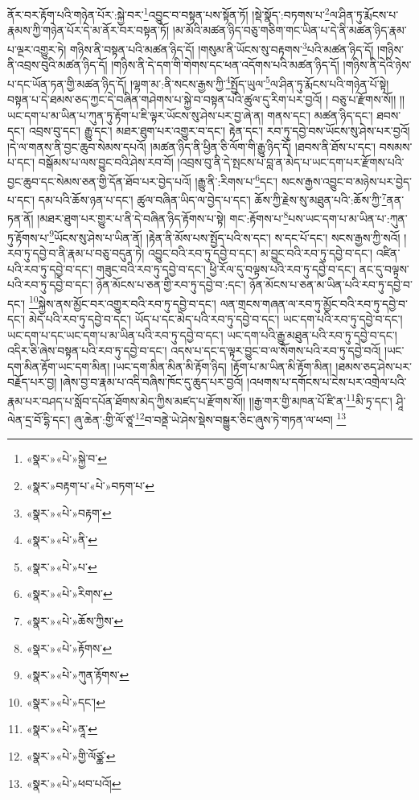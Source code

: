ནོར་བར་རྟོག་པའི་གཉེན་པོར་:སྐྱེ་བར་\footnote{«སྣར་»«པེ་»སྐྱེ་བ་}འབྱུང་བ་བསྟན་པས་སྟོན་ཏོ། །སྡེ་སྣོད་:བཏགས་པ་\footnote{«སྣར་»བརྟག་པ་«པེ་»བཏག་པ་}ལ་ཤིན་ཏུ་རྨོངས་པ་རྣམས་ཀྱི་གཉེན་པོར་དེ་མ་ནོར་བར་བསྟན་ཏོ། །མ་མོའི་མཚན་ཉིད་བཅུ་གཅིག་གང་ཡིན་པ་དེ་ནི་མཚན་ཉིད་རྣམ་པ་ལྔར་འགྱུར་ཏེ། གཉིས་ནི་བསྟན་པའི་མཚན་ཉིད་དོ། །གསུམ་ནི་ཡོངས་སུ་བརྟགས་\footnote{«སྣར་»«པེ་»བརྟག་}པའི་མཚན་ཉིད་དོ། །གཉིས་ནི་འབྲས་བུའི་མཚན་ཉིད་དོ། །གཉིས་ནི་དེ་དག་གི་གེགས་དང་ཕན་འདོགས་པའི་མཚན་ཉིད་དོ། །གཉིས་ནི་དེའི་ཉེས་པ་དང་ཡོན་ཏན་གྱི་མཚན་ཉིད་དོ། །ལྷག་མ་:ནི་སངས་རྒྱས་ཀྱི་\footnote{«སྣར་»«པེ་»ནི་}སྤྱོད་ཡུལ་\footnote{«སྣར་»«པེ་»པ་}ལ་ཤིན་ཏུ་རྨོངས་པའི་གཉེན་པོ་སྟེ། བསྟན་པ་དེ་ཐམས་ཅད་ཀྱང་དེ་བཞིན་གཤེགས་པ་སྐྱེ་བ་བསྟན་པའི་ཚུལ་དུ་རིག་པར་བྱའོ། །
བཅུ་པ་རྫོགས་སོ།། །།ཡང་དག་པ་མ་ཡིན་པ་ཀུན་ཏུ་རྟོག་པ་ཇི་ལྟར་ཡོངས་སུ་ཤེས་པར་བྱ་ཞེ་ན། གནས་དང་། མཚན་ཉིད་དང་། ཐབས་དང་། འབྲས་བུ་དང་། རྒྱུ་དང་། མཐར་ཐུག་པར་འགྱུར་བ་དང་། རྟེན་དང་། རབ་ཏུ་དབྱེ་བས་ཡོངས་སུ་ཤེས་པར་བྱའོ། །དེ་ལ་གནས་ནི་བྱང་ཆུབ་སེམས་དཔའོ། །མཚན་ཉིད་ནི་ཕྱིན་ཅི་ལོག་གི་རྒྱུ་ཉིད་དོ། །ཐབས་ནི་ཐོས་པ་དང་། བསམས་པ་དང་། བསྒོམས་པ་ལས་བྱུང་བའི་ཤེས་རབ་བོ། །འབྲས་བུ་ནི་དེ་སྤངས་པ་བླ་ན་མེད་པ་ཡང་དག་པར་རྫོགས་པའི་བྱང་ཆུབ་དང་སེམས་ཅན་གྱི་དོན་ཐོབ་པར་བྱེད་པའོ། །རྒྱུ་ནི་:རིགས་པ་\footnote{«སྣར་»«པེ་»རིགས་}དང་། སངས་རྒྱས་འབྱུང་བ་མཉེས་པར་བྱེད་པ་དང་། དམ་པའི་ཆོས་ཉན་པ་དང་། ཚུལ་བཞིན་ཡིད་ལ་བྱེད་པ་དང་། ཆོས་ཀྱི་རྗེས་སུ་མཐུན་པའི་:ཆོས་ཀྱི་\footnote{«སྣར་»«པེ་»ཆོས་ཀྱིས་}ནན་ཏན་ནོ། །མཐར་ཐུག་པར་གྱུར་པ་ནི་དེ་བཞིན་ཉིད་རྟོགས་པ་སྟེ། གང་:རྟོགས་པ་\footnote{«སྣར་»«པེ་»རྟོགས་}པས་ཡང་དག་པ་མ་ཡིན་པ་:ཀུན་ཏུ་རྟོགས་པ་\footnote{«སྣར་»«པེ་»ཀུན་རྟོགས་}ཡོངས་སུ་ཤེས་པ་ཡིན་ནོ། །རྟེན་ནི་མོས་པས་སྤྱོད་པའི་ས་དང་། ས་དང་པོ་དང་། སངས་རྒྱས་ཀྱི་སའོ། །རབ་ཏུ་དབྱེ་བ་ནི་རྣམ་པ་བཅུ་བདུན་ཏེ། འབྱུང་བའི་རབ་ཏུ་དབྱེ་བ་དང་། མ་བྱུང་བའི་རབ་ཏུ་དབྱེ་བ་དང་། འཛིན་པའི་རབ་ཏུ་དབྱེ་བ་དང་། གཟུང་བའི་རབ་ཏུ་དབྱེ་བ་དང་། ཕྱི་རོལ་དུ་བལྟས་པའི་རབ་ཏུ་དབྱེ་བ་དང་། ནང་དུ་བལྟས་པའི་རབ་ཏུ་དབྱེ་བ་དང་། ཉོན་མོངས་པ་ཅན་གྱི་རབ་ཏུ་དབྱེ་བ་:དང་། ཉོན་མོངས་པ་ཅན་མ་ཡིན་པའི་རབ་ཏུ་དབྱེ་བ་དང་། \footnote{«སྣར་»«པེ་»དང་།  }སྐྱེས་ནས་མྱོང་བར་འགྱུར་བའི་རབ་ཏུ་དབྱེ་བ་དང་། ལན་གྲངས་གཞན་ལ་རབ་ཏུ་མྱོང་བའི་རབ་ཏུ་དབྱེ་བ་དང་། མེད་པའི་རབ་ཏུ་དབྱེ་བ་དང་། ཡོད་པ་དང་མེད་པའི་རབ་ཏུ་དབྱེ་བ་དང་། ཡང་དག་པའི་རབ་ཏུ་དབྱེ་བ་དང་། ཡང་དག་པ་དང་ཡང་དག་པ་མ་ཡིན་པའི་རབ་ཏུ་དབྱེ་བ་དང་། ཡང་དག་པའི་རྒྱུ་མཐུན་པའི་རབ་ཏུ་དབྱེ་བ་དང་། འདིར་ཅི་ཞེས་བསྟན་པའི་རབ་ཏུ་དབྱེ་བ་དང་། འདས་པ་དང་ད་ལྟར་བྱུང་བ་ལ་སོགས་པའི་རབ་ཏུ་དབྱེ་བའོ། །ཡང་དག་མིན་རྟོག་ཡང་དག་མིན། །ཡང་དག་མིན་མིན་མི་རྟོག་ཉིད། །རྟོག་པ་མ་ཡིན་མི་རྟོག་མིན། །ཐམས་ཅད་ཤེས་པར་བརྗོད་པར་བྱ། །ཞེས་བྱ་བ་རྣམ་པ་འདི་བཞིས་ཁོང་དུ་ཆུད་པར་བྱའོ། །འཕགས་པ་དགོངས་པ་ངེས་པར་འགྲེལ་པའི་རྣམ་པར་བཤད་པ་སློབ་དཔོན་ཐོགས་མེད་ཀྱིས་མཛད་པ་རྫོགས་སོ།། །།རྒྱ་གར་གྱི་མཁན་པོ་ཛི་ན་\footnote{«སྣར་»«པེ་»ནཱ་}མི་ཏྲ་དང་། ཤཱི་ལེན་དྲ་བོ་དྷི་དང་། ཞུ་ཆེན་:གྱི་ལོ་ཙཱ་\footnote{«སྣར་»«པེ་»གྱི་ལོཙྪ་}བ་བནྡེ་ཡེ་ཤེས་སྡེས་བསྒྱུར་ཅིང་ཞུས་ཏེ་གཏན་ལ་ཕབ། \footnote{«སྣར་»«པེ་»ཕབ་པའོ། }